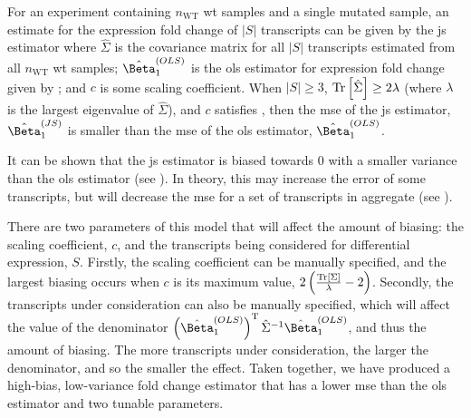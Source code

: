 \begin{theorem}
  For an experiment containing $n_\mathrm{WT}$ \gls{wt} samples and a single mutated sample, an estimate for the expression fold change of $|S|$ transcripts can be given by the \gls{js} estimator  where $\hat{\Sigma}$ is the covariance matrix for all $|S|$ transcripts estimated from all $n_\mathrm{WT}$ \gls{wt} samples; $\hat{\Beta}_1^{(OLS)}$ is the \gls{ols} estimator for expression fold change given by ; and $c$ is some scaling coefficient.
  When $|S| \ge 3$, $\mathrm{Tr} \left[ \hat{\Sigma} \right] \ge 2\lambda$ (where $\lambda$ is the largest eigenvalue of $\hat{\Sigma}$), and $c$ satisfies , then the \gls{mse} of the \gls{js} estimator, $\hat{\Beta}_1^{(JS)}$ is smaller than the \gls{mse} of the \gls{ols} estimator, $\hat{\Beta}_1^{(OLS)}$.
\end{theorem}

It can be shown that the \gls{js} estimator is biased towards 0 with a smaller variance than the \gls{ols} estimator (see ).
In theory, this may increase the error of some transcripts, but will decrease the \gls{mse} for a set of transcripts in aggregate (see ).

There are two parameters of this model that will affect the amount of biasing: the scaling coefficient, $c$, and the transcripts being considered for differential expression, $S$.
Firstly, the scaling coefficient can be manually specified, and the largest biasing occurs when $c$ is its maximum value, $2 \left( \frac{\mathrm{Tr} \left[ \Sigma \right]}{\lambda} - 2 \right)$.
Secondly, the transcripts under consideration can also be manually specified, which will affect the value of the denominator $\left( \hat{\Beta}_1^{(OLS)} \right)^\tran \hat{\Sigma}^{-1} \hat{\Beta}_1^{(OLS)}$, and thus the amount of biasing.
The more transcripts under consideration, the larger the denominator, and so the smaller the effect.
Taken together, we have produced a high-bias, low-variance fold change estimator that has a lower \gls{mse} than the \gls{ols} estimator and two tunable parameters.
